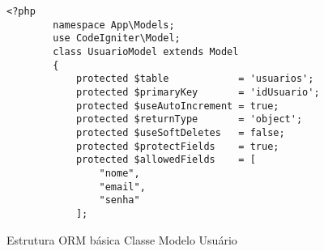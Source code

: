 \begin{figure}[h!]
    \centering
    \begin{lstlisting}[style=phplisting]
        <?php
        namespace App\Models;
        use CodeIgniter\Model;
        class UsuarioModel extends Model
        {
            protected $table            = 'usuarios';
            protected $primaryKey       = 'idUsuario';
            protected $useAutoIncrement = true;
            protected $returnType       = 'object';
            protected $useSoftDeletes   = false;
            protected $protectFields    = true;
            protected $allowedFields    = [
                "nome",
                "email",
                "senha"
            ];
    \end{lstlisting}
    \caption{Estrutura ORM básica Classe Modelo Usuário}
    \label{fig:UsuarioModel_orm}
\end{figure}